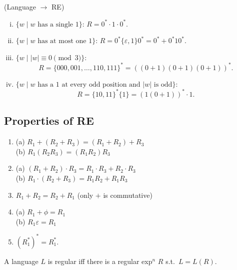 \begin{example}
(Language $\to$ RE)
\begin{enumerate}[(i)]
    \item $\{w \mid w \text{ has a single } 1\}$: \quad $R = 0^* \cdot 1 \cdot 0^*$.
    \item $\{w \mid w \text{ has at most one } 1\}$: \quad $R = 0^* \{\varepsilon, 1\} 0^* = 0^* + 0^*10^*$.
    \item $\{w \mid |w| \equiv 0 \pmod 3\}$:
    \[
    R = \{000, 001, \dots, 110, 111\}^* = ((0+1)(0+1)(0+1))^*.
    \]
    \item $\{w \mid w \text{ has a } 1 \text{ at every odd position and } |w| \text{ is odd}\}$:
    \[
    R = \{10, 11\}^* \{1\} = (1(0+1))^* \cdot 1.
    \]
\end{enumerate}
\end{example}

\subsection{Properties of RE}

\begin{enumerate}[1)]
    \item[1)] (a) $R_1 + (R_2 + R_3) = (R_1 + R_2) + R_3$ \\
    (b) $R_1(R_2 R_3) = (R_1 R_2) R_3$
    \item[2)] (a) $(R_1 + R_2) \cdot R_3 = R_1 \cdot R_3 + R_2 \cdot R_3$ \\
    (b) $R_1 \cdot (R_2 + R_3) = R_1 R_2 + R_1 R_3$
    \item[3)] $R_1 + R_2 = R_2 + R_1$ \quad (only $+$ is commutative)
    \item[4)] (a) $R_1 + \phi = R_1$ \\
    (b) $R_1 \varepsilon = R_1$
    \item[5)] $(R_1^*)^* = R_1^*$.
\end{enumerate}

\begin{blackbox}
\begin{theorem}
A language $L$ is regular iff there is a regular exp$^n$ $R$ s.t.\ $L = L(R)$.
\end{theorem}
\end{blackbox}

